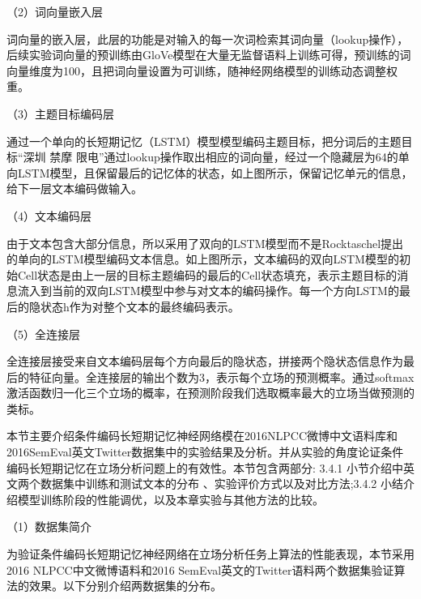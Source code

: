 （2）词向量嵌入层

词向量的嵌入层，此层的功能是对输入的每一次词检索其词向量（lookup操作），后续实验词向量的预训练由GloVe模型在大量无监督语料上训练可得，预训练的词向量维度为100，且把词向量设置为可训练，随神经网络模型的训练动态调整权重。

（3）主题目标编码层

通过一个单向的长短期记忆（LSTM）模型模型编码主题目标，把分词后的主题目标“深圳 禁摩 限电”通过lookup操作取出相应的词向量，经过一个隐藏层为64的单向LSTM模型，且保留最后的记忆体的状态，如上图所示，保留记忆单元的信息，给下一层文本编码做输入。

（4）文本编码层

由于文本包含大部分信息，所以采用了双向的LSTM模型而不是Rocktaschel提出的单向的LSTM模型编码文本信息。如上图所示，文本编码的双向LSTM模型的初始Cell状态是由上一层的目标主题编码的最后的Cell状态填充，表示主题目标的消息流入到当前的双向LSTM模型中参与对文本的编码操作。每一个方向LSTM的最后的隐状态h作为对整个文本的最终编码表示。

（5）全连接层


全连接层接受来自文本编码层每个方向最后的隐状态，拼接两个隐状态信息作为最后的特征向量。全连接层的输出个数为3，表示每个立场的预测概率。通过softmax激活函数归一化三个立场的概率，在预测阶段我们选取概率最大的立场当做预测的类标。


本节主要介绍条件编码长短期记忆神经网络模在2016NLPCC微博中文语料库和2016SemEval英文Twitter数据集中的实验结果及分析。并从实验的角度论证条件编码长短期记忆在立场分析问题上的有效性。本节包含两部分: 3.4.1 小节介绍中英文两个数据集中训练和测试文本的分布 、实验评价方式以及对比方法;3.4.2 小结介绍模型训练阶段的性能调优，以及本章实验与其他方法的比较。


（1）数据集简介

为验证条件编码长短期记忆神经网络在立场分析任务上算法的性能表现，本节采用2016 NLPCC中文微博语料和2016 SemEval英文的Twitter语料两个数据集验证算法的效果。以下分别介绍两数据集的分布。


